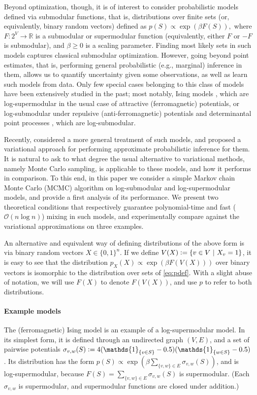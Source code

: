 Beyond optimization, though, it is of interest to consider probabilistic models defined via submodular functions, that is, distributions over finite sets (or, equivalently, binary random vectors) defined as $p(S) \propto \exp(\beta F(S)),$ where $F : 2^V \to \mathbb{R}$ is a submodular or supermodular function (equivalently, either $F$ or $-F$ is submodular), and $\beta \geq 0$ is a scaling parameter.
Finding most likely sets in such models captures classical submodular optimization.
However, going beyond point estimates, that is, performing general probabilistic (e.g., marginal) inference in them, allows us to quantify uncertainty given some observations, as well as learn such models from data.
Only few special cases belonging to this class of models have been extensively studied in the past; most notably, Ising models \cite{koller09}, which are log-supermodular in the usual case of attractive (ferromagnetic) potentials, or log-submodular under repulsive (anti-ferromagnetic) potentials and determinantal point processes \cite{kulesza12}, which are log-submodular.

Recently, \citet{djolonga14} considered a more general treatment of such models, and proposed a variational approach for performing approximate probabilistic inference for them.
It is natural to ask to what degree the usual alternative to variational methods, namely Monte Carlo sampling, is applicable to these models, and how it performs in comparison.
To this end, in this paper we consider a simple Markov chain Monte Carlo (MCMC) algorithm on log-submodular and log-supermodular models, and provide a first analysis of its performance.
We present two theoretical conditions that respectively guarantee polynomial-time and fast ($\mathcal{O}(n \log n)$) mixing in such models, and experimentally compare against the variational approximations on three examples.

An alternative and equivalent way of defining distributions of the above form is via binary random vectors $X \in \{0, 1\}^n$.
If we define $V(X) \vcentcolon= \left\{v \in V\ \middle\vert\  X_v = 1\right\}$, it is easy to see that the distribution $p_X(X) \propto \exp(\beta F(V(X)))$ over binary vectors is isomorphic to the distribution over sets of \eqref{eq:pdef}.
With a slight abuse of notation, we will use $F(X)$ to denote $F(V(X))$, and use $p$ to refer to both distributions.

\paragraph{Example models}
The (ferromagnetic) Ising model is an example of a log-supermodular model.
In its simplest form, it is defined through an undirected graph $(V, E)$, and a set of pairwise potentials $\sigma_{v,w}(S) \defeq 4(\mathds{1}_{\{v \in S\}}-0.5)(\mathds{1}_{\{w \in S\}}-0.5)$.
Its distribution has the form $p(S) \propto \exp(\beta\sum_{\{v,w\} \in E} \sigma_{v,w}(S))$, and is log-supermodular, because $F(S) = \sum_{\{v,w\} \in E} \sigma_{v,w}(S)$ is supermodular. (Each $\sigma_{v,w}$ is supermodular, and supermodular functions are closed under addition.)

